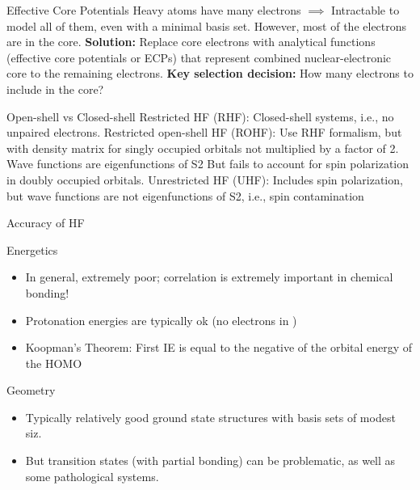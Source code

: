 \documentclass[aspectratio=169]{beamer}
\begin{document}
\begin{frame}{Effective Core Potentials}
    Heavy atoms have many electrons $\implies$ Intractable to model all of them, even with a minimal basis set.\newline
\newline
However, most of the electrons are in the core.\newline
\newline
\textbf{Solution:} Replace core electrons with analytical functions (effective core potentials or ECPs) that represent combined nuclear-electronic core to the remaining electrons.\newline
\newline
\textbf{Key selection decision:} How many electrons to include in the core?

\end{frame}


\begin{frame}{Open-shell vs Closed-shell}
Restricted HF (RHF): Closed-shell systems, i.e., no unpaired electrons.\newline
\newline
Restricted open-shell HF (ROHF): Use RHF formalism, but with density matrix for singly occupied orbitals not multiplied by a factor of 2. Wave functions are eigenfunctions of S2 But fails to account for spin polarization in doubly occupied orbitals.\newline
\newline
Unrestricted HF (UHF): Includes spin polarization, but wave functions are not eigenfunctions of S2, i.e., spin contamination

\end{frame}

\begin{frame}{Accuracy of HF}

Energetics
\begin{itemize}
    \item In general, extremely poor; correlation is extremely important in chemical bonding!
    \item Protonation energies are typically ok (no electrons in )
    \item Koopman's Theorem: First IE is equal to the negative of the orbital energy of the HOMO
\end{itemize}

Geometry
\begin{itemize}
    \item Typically relatively good ground state structures with basis sets of modest siz.
    \item But transition states (with partial bonding) can be problematic, as well as some pathological systems.
\end{itemize}

\end{frame}
\end{document}
